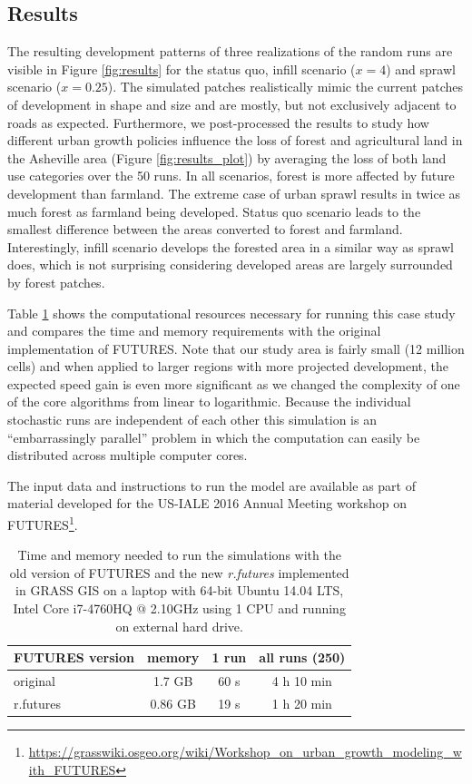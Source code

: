 \documentclass{isprs}
\begin{document}
\subsection{Results}
The resulting development patterns of three realizations of the random runs
are visible in Figure \ref{fig:results}
for the status quo, infill scenario ($x = 4$) and sprawl scenario ($x=0.25$).
The simulated patches realistically mimic the current patches of development in shape and size
and are mostly, but not exclusively adjacent to roads as expected.
Furthermore, we post-processed the results to study how different urban growth policies
influence the loss of forest and agricultural land in the Asheville area
(Figure \ref{fig:results_plot})
by averaging the loss of both land use categories over the 50 runs.
In all scenarios, forest is more affected by future development than farmland.
The extreme case of urban sprawl results in twice as much forest as farmland being developed.
Status quo scenario leads to the smallest difference between the areas converted to forest and farmland.
Interestingly, infill scenario develops the forested area in a similar way as sprawl does, which 
is not surprising considering developed areas are largely surrounded by forest patches.




Table \ref{tab:benchmark} shows the computational resources
necessary for running this case study and compares 
the time and memory requirements with the original
implementation of FUTURES. Note that
our study area is fairly small (12 million cells)
and when applied to larger regions with more projected development, 
the expected speed gain is even more significant
as we changed the complexity of one of the core algorithms from linear to logarithmic.
Because the individual stochastic runs are independent of each other
this simulation is an
``embarrassingly parallel''  problem \cite{herlihy2012art}
in which the computation can easily be distributed across multiple computer cores.

The input data and instructions to run the model are available as part of material
developed for the US-IALE 2016 Annual Meeting workshop on FUTURES\footnote{\url{https://grasswiki.osgeo.org/wiki/Workshop_on_urban_growth_modeling_with_FUTURES}}.

\begin{table}[htp]
 \centering
\begin{center}
\begin{tabular}{lccc}
\toprule
FUTURES version & memory & 1 run & all runs (250)\\ \midrule
original & 1.7 GB & 60 s & 4 h 10 min\\
r.futures  & 0.86 GB & 19 s & 1 h 20 min\\
\bottomrule
\end{tabular}
\end{center}
 \caption{Time and memory needed to run the simulations
 with the old version of FUTURES and the new  \emph{r.futures}
 implemented in GRASS GIS on a laptop with 64-bit Ubuntu 14.04 LTS,
 Intel Core i7-4760HQ $@$ 2.10GHz using 1 CPU and running on external hard drive.}
 \label{tab:benchmark}
\end{table}
\end{document}
